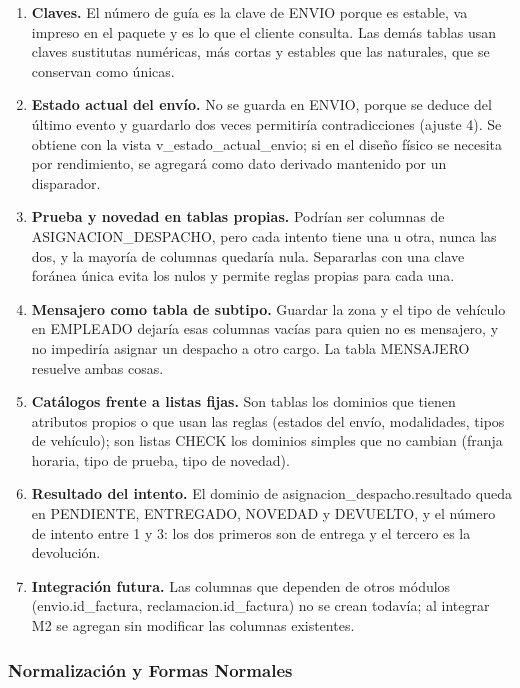 \begin{enumerate}[label=\arabic*.,leftmargin=1.2cm,itemsep=2pt]
  \item \textbf{Claves.} El número de guía es la clave de ENVIO porque
        es estable, va impreso en el paquete y es lo que el cliente
        consulta. Las demás tablas usan claves sustitutas numéricas, más
        cortas y estables que las naturales, que se conservan como
        únicas.
  \item \textbf{Estado actual del envío.} No se guarda en ENVIO, porque
        se deduce del último evento y guardarlo dos veces permitiría
        contradicciones (ajuste 4). Se obtiene con la vista
        v\_estado\_actual\_envio; si en el diseño físico se necesita por
        rendimiento, se agregará como dato derivado mantenido por un
        disparador.
  \item \textbf{Prueba y novedad en tablas propias.} Podrían ser columnas
        de ASIGNACION\_DESPACHO, pero cada intento tiene una u otra, nunca
        las dos, y la mayoría de columnas quedaría nula. Separarlas con
        una clave foránea única evita los nulos y permite reglas propias
        para cada una.
  \item \textbf{Mensajero como tabla de subtipo.} Guardar la zona y el
        tipo de vehículo en EMPLEADO dejaría esas columnas vacías para
        quien no es mensajero, y no impediría asignar un despacho a otro
        cargo. La tabla MENSAJERO resuelve ambas cosas.
  \item \textbf{Catálogos frente a listas fijas.} Son tablas los
        dominios que tienen atributos propios o que usan las reglas
        (estados del envío, modalidades, tipos de vehículo); son listas
        CHECK los dominios simples que no cambian (franja horaria, tipo
        de prueba, tipo de novedad).
  \item \textbf{Resultado del intento.} El dominio de
        asignacion\_despacho.resultado queda en PENDIENTE, ENTREGADO,
        NOVEDAD y DEVUELTO, y el número de intento entre 1 y 3: los dos
        primeros son de entrega y el tercero es la devolución.
  \item \textbf{Integración futura.} Las columnas que dependen de otros
        módulos (envio.id\_factura, reclamacion.id\_factura) no se crean
        todavía; al integrar M2 se agregan sin modificar las columnas
        existentes.
\end{enumerate}

\subsubsection{Normalización y Formas Normales}


